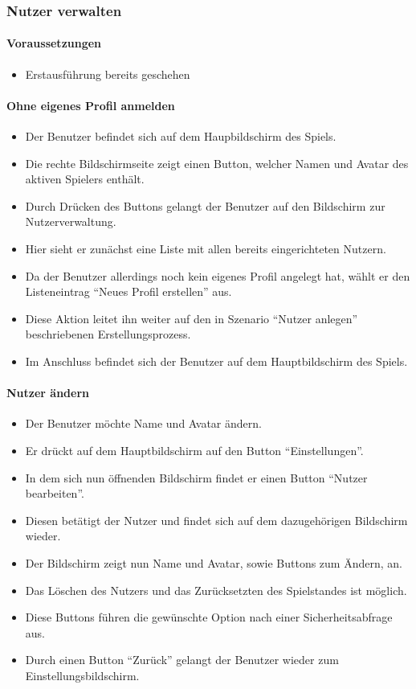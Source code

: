 \subsubsection{Nutzer verwalten}
\paragraph{Voraussetzungen}
\begin{itemize}
\item Erstausführung bereits geschehen
\end{itemize}

\paragraph{Ohne eigenes Profil anmelden}
\begin{itemize}
\item Der Benutzer befindet sich auf dem Haupbildschirm des Spiels.
\item Die rechte Bildschirmseite zeigt einen Button, welcher Namen und Avatar des aktiven Spielers enthält.
\item Durch Drücken des Buttons gelangt der Benutzer auf den Bildschirm zur Nutzerverwaltung.
\item Hier sieht er zunächst eine Liste mit allen bereits 
eingerichteten Nutzern.
\item Da der Benutzer allerdings noch kein eigenes Profil
angelegt hat, wählt er den Listeneintrag "`Neues Profil erstellen"' aus.
\item Diese Aktion leitet ihn weiter auf den in Szenario "`Nutzer anlegen"'
beschriebenen Erstellungsprozess.
\item Im Anschluss befindet sich der Benutzer auf dem Hauptbildschirm des Spiels.
\end{itemize}

\paragraph{Nutzer ändern}
\begin{itemize}
\item Der Benutzer möchte Name und Avatar ändern.
\item Er drückt auf dem Hauptbildschirm auf den Button "`Einstellungen"'.
\item In dem sich nun öffnenden Bildschirm findet er einen Button "`Nutzer bearbeiten"'.
\item Diesen betätigt der Nutzer und findet sich auf dem dazugehörigen
Bildschirm wieder. 
\item Der Bildschirm zeigt nun Name und Avatar, sowie Buttons zum Ändern, an.
\item Das Löschen des Nutzers und das Zurücksetzten des Spielstandes ist möglich. 
\item Diese Buttons führen die gewünschte Option nach einer Sicherheitsabfrage aus.
\item Durch einen Button "`Zurück"' gelangt der Benutzer wieder zum Einstellungsbildschirm.
\end{itemize}
